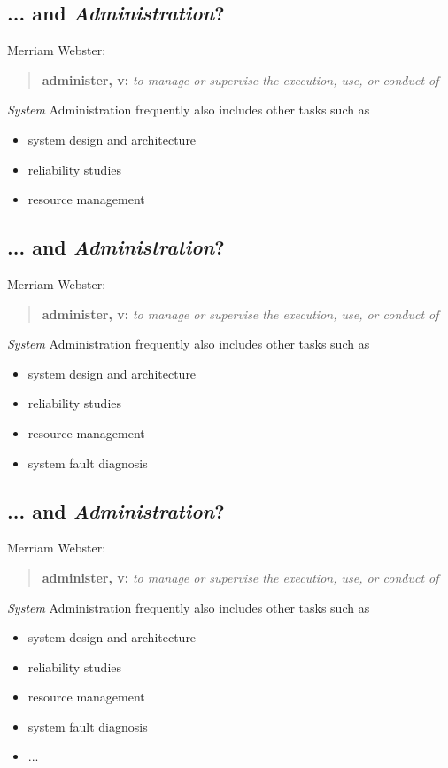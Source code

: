 \documentclass[xga]{xdvislides}
\begin{document}
\subsection{... and {\em Administration}?}
Merriam Webster:
\begin{quote}
	{\bf administer, v:} {\em to manage or supervise the execution, use, or conduct of} \\
\end{quote}


{\em System} Administration frequently also includes other tasks such as
\begin{itemize}
	\item system design and architecture
	\item reliability studies
	\item resource management
\end{itemize}

\subsection{... and {\em Administration}?}
Merriam Webster:
\begin{quote}
	{\bf administer, v:} {\em to manage or supervise the execution, use, or conduct of} \\
\end{quote}

{\em System} Administration frequently also includes other tasks such as
\begin{itemize}
	\item system design and architecture
	\item reliability studies
	\item resource management
	\item system fault diagnosis
\end{itemize}

\subsection{... and {\em Administration}?} Merriam Webster: \begin{quote} {\bf
administer, v:} {\em to manage or supervise the execution, use, or conduct of}
\\ \end{quote}

{\em System} Administration frequently also includes other tasks such as
\begin{itemize}
	\item system design and architecture
	\item reliability studies
	\item resource management
	\item system fault diagnosis
	\item ...
\end{itemize}
\end{document}
